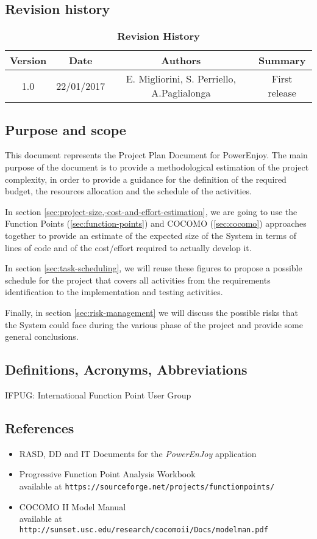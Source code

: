 \subsection{Revision history}
\begin{longtable}{| c | c | c | c |}
	\caption{\textbf{Revision History}}
	\label{tab:rev_history}
	\\ \hline
	
	\textbf{Version} & \textbf{Date} & \textbf{Authors} & \textbf{Summary}\\ \hline
	1.0 & 22/01/2017& E. Migliorini, S. Perriello, A.Paglialonga & First release\\ \hline
\end{longtable}

\subsection{Purpose and scope}
This document represents the Project Plan Document for PowerEnjoy.
The main purpose of the document is to provide a methodological estimation of the project complexity, in order to provide a guidance for the definition of the required budget, the resources allocation and the schedule of the activities.

In section \ref{sec:project-size,-cost-and-effort-estimation}, we are going to use the Function Points (\ref{sec:function-points}) and COCOMO (\ref{sec:cocomo}) approaches together to provide an estimate of the expected size of the System in terms of lines of code and of the cost/effort required to actually develop it.

In section \ref{sec:task-scheduling}, we will reuse these figures to propose a possible schedule for the project that covers all activities from the requirements identification to the implementation and testing activities.

Finally, in section \ref{sec:risk-management} we will discuss the possible risks that the System could face during the various phase of the project and provide some general conclusions.

\subsection{Definitions, Acronyms, Abbreviations}
IFPUG: International Function Point User Group

\subsection{References}
\begin{itemize}
\item RASD, DD and IT Documents for the \textit{PowerEnJoy} application
\item 
Progressive Function Point Analysis Workbook \\
available at \texttt{https://sourceforge.net/projects/functionpoints/}
\item COCOMO II Model Manual\\
available at \texttt{http://sunset.usc.edu/research/cocomoii/Docs/modelman.pdf}
\end{itemize}